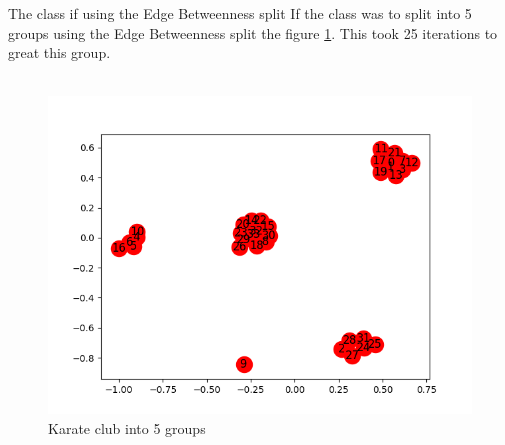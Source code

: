 \documentclass[10pt,letterpaper]{article}
\begin{document}
The class if using the Edge Betweenness split
If the class was to split into 5 groups using the Edge Betweenness split the figure \ref{fig:kart6}.  This took 25 iterations to great this group.\\
\\
\begin{figure}[h!]
  \includegraphics[width=\linewidth]{karate25.png}
  \caption{ Karate club into 5 groups}
  \label{fig:kart6}  
\end{figure}
\pagebreak
\end{document}
